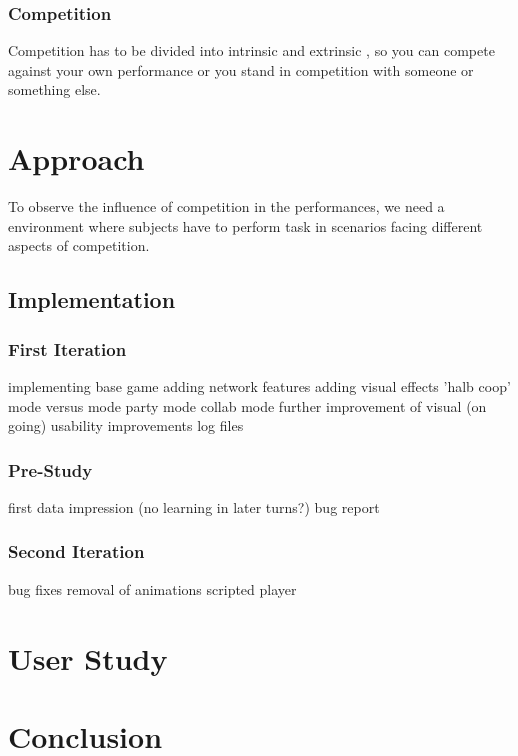 \subsection{Competition}
Competition has to be divided into intrinsic and extrinsic , so you can compete against your own performance or you stand in competition with someone or something else.
\chapter{Approach}
To observe the influence of competition in the performances, we need a environment where subjects have to perform task in  scenarios facing different aspects of competition.
\section{Implementation}
\subsection{First Iteration}
implementing base game\newline
adding network features\newline
adding visual effects\newline
'halb coop' mode \newline
versus mode\newline
party mode \newline
collab mode\newline
further improvement of visual (on going)\newline
usability improvements\newline
log files\newline
\subsection{Pre-Study}
first data impression (no learning in later turns?)
bug report
\subsection{Second Iteration}
bug fixes\newline
removal of animations\newline
scripted player\newline
\chapter{User Study}
\chapter{Conclusion}


